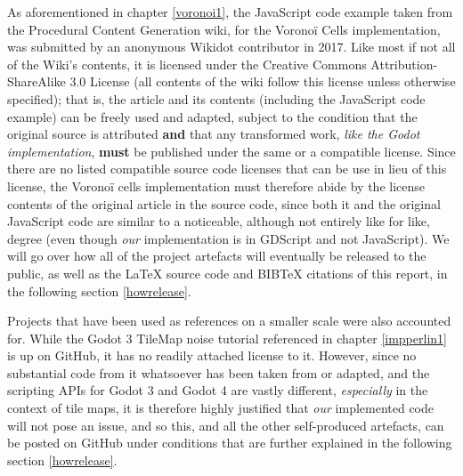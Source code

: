 As aforementioned in chapter \ref{voronoi1}, the JavaScript code example taken from the Procedural Content Generation wiki\cite{pcgwikivoronoi}, for the Voronoï Cells implementation, was submitted by an anonymous Wikidot contributor in 2017. Like most if not all of the Wiki's contents, it is licensed under the Creative Commons Attribution-ShareAlike 3.0 License (all contents of the wiki follow this license unless otherwise specified); that is, the article and its contents (including the JavaScript code example) can be freely used and adapted, subject to the condition that the original source is attributed \textbf{and} that any transformed work, \textit{like the Godot implementation}, \textbf{must} be published under the same or a compatible license.\cite{cc_at_sa_3} Since there are no listed compatible source code licenses that can be use in lieu of this license\cite{cc_compat}, the Voronoï cells implementation must therefore abide by the license contents of the original article in the source code, since both it and the original JavaScript code are similar to a noticeable, although not entirely like for like, degree (even though \textit{our} implementation is in GDScript and not JavaScript). We will go over how all of the project artefacts will eventually be released to the public, as well as the \LaTeX{} source code and BIB\TeX{} citations of this report, in the following section \ref{howrelease}.

Projects that have been used as references on a smaller scale were also accounted for. While the Godot 3 TileMap noise tutorial referenced in chapter \ref{impperlin1} is up on GitHub, it has no readily attached license to it.\cite{gingergd3tutorialGH} However, since no substantial code from it whatsoever has been taken from or adapted, and the scripting APIs for Godot 3 and Godot 4 are vastly different, \textit{especially} in the context of tile maps, it is therefore highly justified that \textit{our} implemented code will not pose an issue, and so this, and all the other self-produced artefacts, can be posted on GitHub under conditions that are further explained in the following section \ref{howrelease}.

